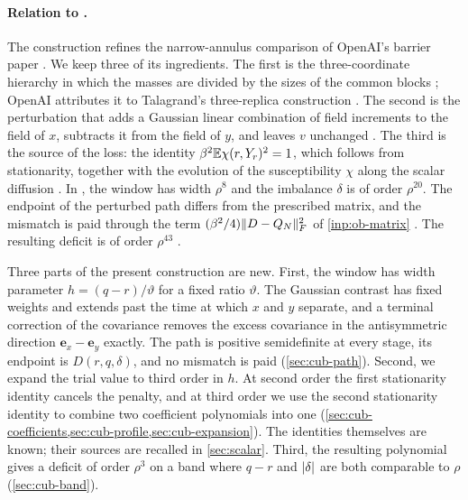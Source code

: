 \paragraph{Relation to \cite[Section~7]{oai-barriers}.}
The construction refines the narrow-annulus comparison of OpenAI's barrier
paper \cite[Section~7, Steps~1--8]{oai-barriers}. We keep three of its
ingredients. The first is the three-coordinate hierarchy in which the masses
are divided by the sizes of the common blocks
\cite[Section~4.2 and Section~7, Step~1, (7.7)]{oai-barriers}; OpenAI attributes
it to Talagrand's three-replica construction
\cite[discussion after Proposition~4.4]{talagrand-2007}. The second is the
perturbation that adds a Gaussian linear combination of field increments to
the field of $x$, subtracts it from the field of $y$, and leaves $v$
unchanged \cite[Section~7, Step~2, (7.8)--(7.12)]{oai-barriers}. The third
is the source of the loss: the identity $\beta^2\mathbb E\chi(r,Y_r)^2=1$, which
follows from stationarity, together with the evolution of the susceptibility
$\chi$ along the scalar diffusion \cite[Section~7, Step~8, (7.31)]{oai-barriers}. In
\cite{oai-barriers}, the window has width $\rho^8$ and the imbalance $\delta$ is
of order $\rho^{20}$. The endpoint of the perturbed path differs from the
prescribed matrix, and the mismatch is paid through the term
$(\beta^2/4)\lVert D-Q_N\rVert_F^2$ of \cref{inp:ob-matrix}
\cite[(7.12)--(7.13)]{oai-barriers}. The resulting deficit is of order $\rho^{43}$
\cite[(7.32)]{oai-barriers}.

Three parts of the present construction are new. First, the window has width
parameter $h=(q-r)/\vartheta$ for a fixed ratio $\vartheta$. The Gaussian contrast has
fixed weights and extends past the time at which $x$ and $y$ separate, and a
terminal correction of the covariance removes the excess covariance in the
antisymmetric direction $\mathbf e_x-\mathbf e_y$ exactly. The path is positive semidefinite at every stage, its
endpoint is $D(r,q,\delta)$, and no mismatch is paid (\cref{sec:cub-path}).
Second, we expand the trial value to third order in $h$. At second order the
first stationarity identity cancels the penalty, and at third order we use the
second stationarity identity to combine two coefficient polynomials into one
(\cref{sec:cub-coefficients,sec:cub-profile,sec:cub-expansion}). The identities
themselves are known; their sources are recalled in \cref{sec:scalar}. Third,
the resulting polynomial gives a deficit of order $\rho^3$ on a band where
$q-r$ and $\lvert \delta\rvert$ are both comparable to $\rho$ (\cref{sec:cub-band}).


